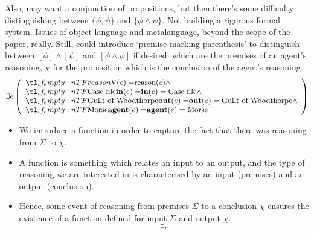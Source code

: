 \documentclass[10pt]{article}
\begin{document}
\begin{itemize}
{    Also, may want a conjunction of propositions, but then there's some difficulty distinguishing between \(\{\phi,\psi\}\) and \(\{\phi \land \psi\}\).
    Not building a rigorous formal system.
    Issues of object language and metalanguage, beyond the scope of the paper, really.
  Still, could introduce `premise marking parenthesis' to distinguish between \([\phi] \land [\psi]\) and \([\phi \land \psi]\) if desired.}
  which are the premises of an agent's reasoning, \(\chi\) for the proposition which is the conclusion of the agent's reasoning.
  \[
    \exists e
    \left(
      \begin{array}{l}
        \everb{reason} \land \\
        \ein{\text{Case file}} \land \\
        \eout{\text{Guilt of Woodthorpe}} \land \\
        \eagent{\text{Morse}}
      \end{array}
    \right)
  \]
  \begin{itemize}
  \item We introduce a function in order to capture the fact that there was reasoning from \(\Sigma\) to \(\chi\).
  \item A function is something which relates an input to an output, and the type of reasoning we are interested in is characterised by an input (premises) and an output (conclusion).
  \item Hence, some event of reasoning from premises \(\Sigma\) to a conclusion \(\chi\) ensures the existence of a function defined for input \(\Sigma\) and output \(\chi\).
    \[
      \exists e
\]
\end{itemize}
\end{itemize}
\end{document}
